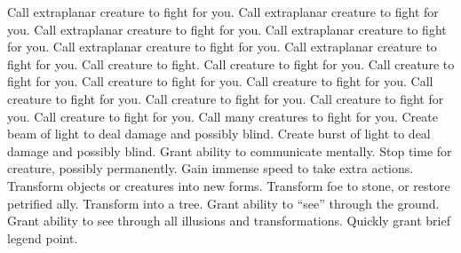    {Call extraplanar creature to fight for you.}
    {Call extraplanar creature to fight for you.}
    {Call extraplanar creature to fight for you.}
    {Call extraplanar creature to fight for you.}
    {Call extraplanar creature to fight for you.}
    {Call extraplanar creature to fight for you.}
    {Call creature to fight.}
    {Call creature to fight for you.}
    {Call creature to fight for you.}
    {Call creature to fight for you.}
    {Call creature to fight for you.}
    {Call creature to fight for you.}
    {Call creature to fight for you.}
    {Call creature to fight for you.}
    {Call creature to fight for you.}
    {Call many creatures to fight for you.}
    {Create beam of light to deal damage and possibly blind.}
    {Create burst of light to deal damage and possibly blind.}
    {Grant ability to communicate mentally.}
    {Stop time for creature, possibly permanently.}
    {Gain immense speed to take extra actions.}
    {Transform objects or creatures into new forms.}
    {Transform foe to stone, or restore petrified ally.}
    {Transform into a tree.}
    {Grant ability to ``see'' through the ground.}
    {Grant ability to see through all illusions and transformations.}
    {Quickly grant brief legend point.}
